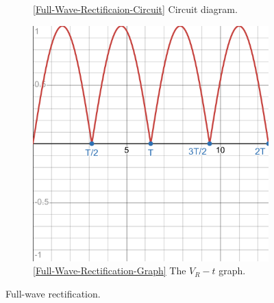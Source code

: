 \documentclass[oneside]{book}
\begin{document}
\begin{itemize}
\begin{itemize}
\begin{figure}[h]
\begin{subfigure}[c]{0.45\textwidth}
                \caption{\ref{Full-Wave-Rectificaion-Circuit} Circuit diagram.}
            \end{subfigure}%
            \begin{subfigure}[c]{0.45\textwidth}
                \centering
                \includegraphics[width=0.7\linewidth]{../images/Full-Wave-Rectification/Full-Wave-Rectification-Graph.pdf}
                \caption{\ref{Full-Wave-Rectification-Graph} The \(V_R-t\) graph.}
            \end{subfigure}
            \caption{Full-wave rectification.}
        \end{figure} 
    \end{itemize}
\end{itemize}
\end{document}
